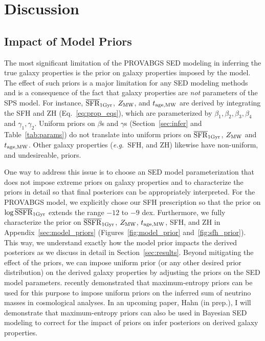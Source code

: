 \section{Discussion} \label{sec:discuss}
\subsection{Impact of Model Priors}
The most significant limitation of the {\sc PROVABGS} SED modeling in
inferring the true galaxy properties is the prior on galaxy properties imposed
by the model. 
The effect of such priors is  a major limitation for any SED modeling
methods~\citep[\emph{e.g.}][]{carnall2017, leja2019} and is a consequence of
the fact that galaxy properties are \emph{not} parameters of the SPS model.
For instance, $\overline{\rm SFR}_{\rm 1Gyr}$, $Z_{\rm MW}$, and $t_{\rm age, MW}$ are derived by integrating the SFH
and ZH (Eq.~\ref{eq:prop_eqs}), which are parameterized by $\beta_1, \beta_2,
\beta_3, \beta_4$ and $\gamma_1, \gamma_2$. 
Uniform priors on $\beta$s and $\gamma$s (Section~\ref{sec:infer} and
Table~\ref{tab:params}) do not translate into uniform priors on $\overline{\rm SFR}_{\rm 1Gyr}$,
$Z_{\rm MW}$ and $t_{\rm age, MW}$.
Other galaxy properties (\emph{e.g.}~SFH, and ZH) likewise have
non-uniform, and undesireable, priors. 

One way to address this issue is to choose an SED model parameterization that
does not impose extreme priors on galaxy properties and to characterize the
priors in detail so that final posteriors can be appropriately interpreted. 
For the {\sc PROVABGS} model, we explicitly chose our SFH prescription so that
the prior on $\log\overline{\rm SSFR}_{\rm 1Gyr}$ extends the range $-12$ to $-9$ dex.
Furthermore, we fully characterize the prior on $\overline{\rm SSFR}_{\rm 1Gyr}$, $Z_{\rm MW}$, $t_{\rm age, MW}$,
SFH, and ZH in Appendix~\ref{sec:model_priors} (Figures~\ref{fig:model_prior}
and~\ref{fig:sfh_prior}). 
This way, we understand exactly how the model prior impacts the derived
posteriors as we discuss in detail in Section~\ref{sec:results}. 
Beyond mitigating the effect of the priors, we can impose uniform prior (or any
other desired prior distribution) on the derived galaxy properties by adjusting
the priors on the SED model parameters. 
\cite{handley2019} recently demonstrated that maximum-entropy priors can be
used for this purpose to impose uniform priors on the inferred sum of neutrino
masses in cosmological analyses. 
In an upcoming paper, Hahn (in prep.), I will demonstrate that maximum-entropy
priors can also be used in Bayesian SED modeling to correct for the impact of
priors on infer posteriors on derived galaxy properties. 

